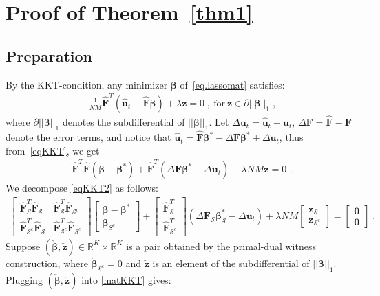\documentclass[a4paper,11pt]{article}
\newcommand{\bbeta}{\bm{\beta}}
\newcommand{\bF}{\mathbf{F}}
\newcommand{\mS}{\mathcal{S}}
\newcommand{\bu}{\mathbf{u}}
\begin{document}
\section{Proof of Theorem~\ref{thm1}}\label{app.proofthm1}
\subsection{Preparation}
By the KKT-condition, any minimizer $\bbeta$ of~\eqref{eq.lassomat} satisfies:
\begin{align}
-\frac{1}{NM}\widehat{\bF}^T(\widehat{\bu}_t-\widehat{\bF}\bbeta)+\lambda \mathbf{z}=0\;,~\text{for}~\mathbf{z}\in\partial||\bbeta||_1\;,\label{eqKKT}
\end{align}
where $\partial||\bbeta||_1$ denotes the subdifferential of $||\bbeta||_1$. Let $\Delta \bu_t=\widehat{\bu}_t-\bu_t$, $\Delta \bF=\widehat{\bF}-\bF$ denote the error terms, and notice that $\widehat{\bu}_t=\widehat{\bF}\bbeta^*-\Delta \bF\bbeta^*+\Delta \bu_t$, thus from~\eqref{eqKKT}, we get
\begin{align}
&\widehat{\bF}^T\widehat{\bF}(\bbeta-\bbeta^*)+\widehat{\bF}^T(\Delta \bF\bbeta^*-\Delta \bu_t)+\lambda NM\mathbf{z}=0\;~\label{eqKKT2}.
\end{align}
We decompose \eqref{eqKKT2} as follows:
\begin{align}
\begin{bmatrix}
\widehat{\bF}^T_S\widehat{\bF}_\mS&\widehat{\bF}^T_\mS\widehat{\bF}_{\mS^c}\\
\widehat{\bF}^T_{\mS^c}\widehat{\bF}_\mS&\widehat{\bF}^T_{\mS^c}\widehat{\bF}_{\mS^c}
\end{bmatrix}\begin{bmatrix}
\bbeta-\bbeta^*\\
\bbeta_{S^c}
\end{bmatrix}
+\begin{bmatrix}
\widehat{\bF}_\mS^T\\
\widehat{\bF}_{\mS^c}^T
\end{bmatrix}(\Delta \bF_\mS\bbeta_\mS^*-\Delta \bu_t)
+\lambda NM\begin{bmatrix}
\mathbf{z}_\mS\\
\mathbf{z}_{\mS^c}
\end{bmatrix}=\begin{bmatrix}
	\mathbf{0}\\\mathbf{0}
\end{bmatrix}\;.\label{matKKT}
\end{align}
Suppose $(\check{\bbeta},\check{\mathbf{z}})\in\mathbb{R}^K\times\mathbb{R}^K$ is a pair obtained by the primal-dual witness construction, where $\check{\bbeta}_{\mS^c}=0$ and $\check{\mathbf{z}}$ is an element of the subdifferential of $||\check{\bbeta}||_1$.  Plugging $(\check{\bbeta},\check{\mathbf{z}})$ into \eqref{matKKT} gives:
\end{document}
